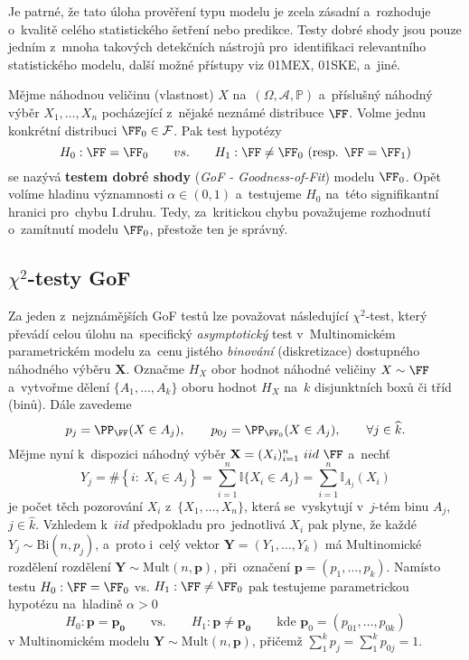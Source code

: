 Je patrné, že tato úloha prověření typu modelu je zcela zásadní a~rozhoduje o~kvalitě celého statistického šetření nebo predikce. Testy dobré shody jsou pouze jedním z~mnoha takových detekčních nástrojů pro~identifikaci relevantního statistického modelu, další možné přístupy viz 01MEX, 01SKE, a~jiné.

\begin{define}
	Mějme náhodnou veličinu (vlastnost) $X$ na~$(\Omega, \mathcal{A}, \mathbb{P})$ a~příslušný náhodný výběr $X_1,\ldots,X_n$ pocházející z~nějaké neznámé distribuce $\FF$. Volme jednu konkrétní distribuci $\FF_0\in \mathcal{F}$. Pak test hypotézy
	$$ H_0: \FF=\FF_0 \qquad vs. \qquad H_1: \FF\neq \FF_0 \text{ (resp. } \FF=\FF_1) $$
	se nazývá \textbf{testem dobré shody} (\textit{GoF - Goodness-of-Fit}) modelu $\FF_0$. Opět volíme hladinu významnosti $\alpha\in(0,1)$ a~testujeme $H_0$ na~této signifikantní hranici pro~chybu I.druhu. Tedy, za~kritickou chybu považujeme rozhodnutí o~zamítnutí modelu $\FF_0$, přestože ten je správný.
\end{define}

\subsection*{$\chi^2$-testy GoF}
Za jeden z~nejznámějších GoF testů lze považovat následující $\chi^2$-test, který převádí celou úlohu na~specifický {\em asymptotický} test v~Multinomickém parametrickém modelu za~cenu jistého \emph{binování} (diskretizace) dostupného náhodného výběru $\mathbf X$. Označme $H_X$ obor hodnot náhodné veličiny $X\sim \FF$ a~vytvořme dělení $\{A_1,\dots,A_k\}$ oboru hodnot $H_X$ na~$k$ disjunktních boxů či tříd (binů). Dále zavedeme
$$ p_j=\PP_\FF(X\in A_j), \qquad p_{0j}=\PP_{\FF_0}(X\in A_j), \qquad\forall j\in \widehat k.$$
Mějme nyní k~dispozici náhodný výběr $\mathbf X=(X_i)_{i=1}^n~iid~\FF$ a~nechť
$$ Y_j=\#\left\{i:\ X_i\in A_j\right\}= \sum_{i=1}^n \mathbb I\{X_i\in A_j\}= \sum_{i=1}^n \mathbb I_{A_j}(X_i)$$
je počet těch pozorování $X_i$ z~$\{X_1,\dots,X_n\}$, která se~vyskytují v~$j$-tém binu $A_j$, $j\in\widehat k$.
Vzhledem k~$iid$ předpokladu pro~jednotlivá $X_i$ pak plyne, že každé $Y_j \sim \mathrm{Bi}(n,p_j)$, a~proto i~celý vektor
$ \mathbf Y=(Y_1,\ldots,Y_k)$ má Multinomické rozdělení rozdělení $\mathbf Y \sim \mathrm{Mult}(n,\mathbf p)$, při~označení $\mathbf p=(p_1,\ldots,p_k)$.
Namísto testu $ H_0: \FF=\FF_0$ vs. $H_1: \FF\neq \FF_0$ pak testujeme parametrickou hypotézu na~hladině $\alpha>0$
$$ H_0: \mathbf p = \mathbf{p_0} \qquad\text{vs.}\qquad H_1: \mathbf p \neq \mathbf{p_0} \qquad\text{kde }\mathbf p_0= (p_{01},\ldots,p_{0k})$$
v Multinomickém modelu $\mathbf Y \sim \mathrm{Mult}(n,\mathbf p)$, přičemž $\sum_1^k p_j=\sum_1^k p_{0j}=1$.

